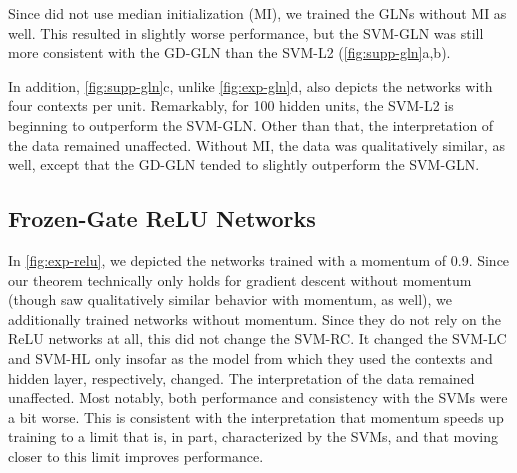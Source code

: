\documentclass{article}
\theoremstyle{plain}
\theoremstyle{definition}
\theoremstyle{remark}
\begin{document}
Since \citet{veness_online_2017} did not use median initialization (MI), we trained the GLNs without MI as well.
This resulted in slightly worse performance, but the SVM-GLN was still more consistent with the GD-GLN than the SVM-L2 (\cref{fig:supp-gln}a,b).

In addition, \cref{fig:supp-gln}c, unlike \cref{fig:exp-gln}d, also depicts the networks with four contexts per unit.
Remarkably, for 100 hidden units, the SVM-L2 is beginning to outperform the SVM-GLN.
Other than that, the interpretation of the data remained unaffected.
Without MI, the data was qualitatively similar, as well, except that the GD-GLN tended to slightly outperform the SVM-GLN.

\subsection{Frozen-Gate ReLU Networks}

In \cref{fig:exp-relu}, we depicted the networks trained with a momentum of 0.9.
Since our theorem technically only holds for gradient descent without momentum (though \citet{soudry_implicit_2018} saw qualitatively similar behavior with momentum, as well), we additionally trained networks without momentum.
Since they do not rely on the ReLU networks at all, this did not change the SVM-RC.
It changed the SVM-LC and SVM-HL only insofar as the model from which they used the contexts and hidden layer, respectively, changed.
The interpretation of the data remained unaffected.
Most notably, both performance and consistency with the SVMs were a bit worse.
This is consistent with the interpretation that momentum speeds up training to a limit that is, in part, characterized by the SVMs, and that moving closer to this limit improves performance.
\end{document}
